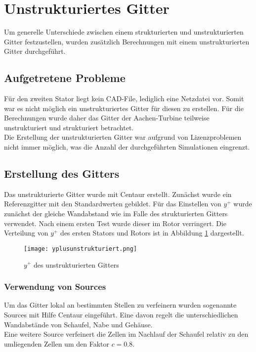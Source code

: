 \section{Unstrukturiertes Gitter}
Um generelle Unterschiede zwischen einem strukturierten und unstrukturierten Gitter festzustellen, wurden zusätzlich Berechnungen mit einem unstrukturierten Gitter durchgeführt.

\subsection{Aufgetretene Probleme}
Für den zweiten Stator liegt kein CAD-File, lediglich eine Netzdatei vor. Somit war es nicht möglich ein unstrukturiertes Gitter für diesen zu erstellen. Für die Berechnungen wurde daher das Gitter der Aachen-Turbine teilweise unstrukturiert und strukturiert betrachtet.\\
Die Erstellung der unstrukturierten Gitter war aufgrund von Lizenzproblemen nicht immer möglich, was die Anzahl der durchgeführten Simulationen eingrenzt.
\subsection{Erstellung des Gitters}
Das unstrukturierte Gitter wurde mit Centaur erstellt. Zunächst wurde ein Referenzgitter mit den Standardwerten gebildet. Für das Einstellen von $y^+$ wurde zunächst der gleiche Wandabstand wie im Falle des strukturierten Gitters verwendet. Nach einem ersten Test wurde dieser im Rotor verringert. Die Verteilung von $y^+$ des ersten Stators und Rotors ist in Abbildung \ref{yplusunstrukturiert} dargestellt.
\begin{figure}[htbp]
	\centering
	\texttt{[image: yplusunstrukturiert.png]}
	\caption{$y^+$ des unstrukturierten Gitters} \label{yplusunstrukturiert}
\end{figure}
\subsubsection{Verwendung von Sources}
Um das Gitter lokal an bestimmten Stellen zu verfeinern wurden  sogenannte Sources mit Hilfe Centaur eingeführt.
Eine davon regelt die unterschiedlichen Wandabstände von Schaufel, Nabe und Gehäuse.\\
Eine weitere Source verfeinert die Zellen im Nachlauf der Schaufel relativ zu den umliegenden Zellen um den Faktor $c = 0.8$.

